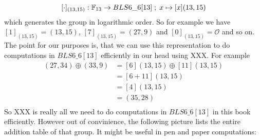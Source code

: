 $$
[\cdot]_{(13,15)}: \mathbb{F}_{13} \to BLS6\_6[13]\;;\; x \mapsto [x](13,15)
$$
which generates the group in logarithmic order. So for example we have $[1]_{(13,15)}= (13,15)$, $[7]_{(13,15)}= (27,9)$ and $[0]_{(13,15)}= \mathcal{O}$ and so on. The point for our purposes is, that we can use this representation to do computations in $BLS6\_6[13]$ efficiently in our head using XXX. For example 
\begin{align*}
(27,34)\oplus (33,9)  & = [6](13,15)\oplus [11](13,15)\\
                      & = [6+11](13,15)\\
                      & = [4](13,15)\\
                      & = (35,28)\\
\end{align*}
So XXX is really all we need to do computations in $BLS6\_6[13]$ in this book efficiently. However out of convinience, the following picture lists the entire addition table of that group. It might be useful in pen and paper computations:
\begingroup
    \fontsize{5pt}{5pt}\selectfont
